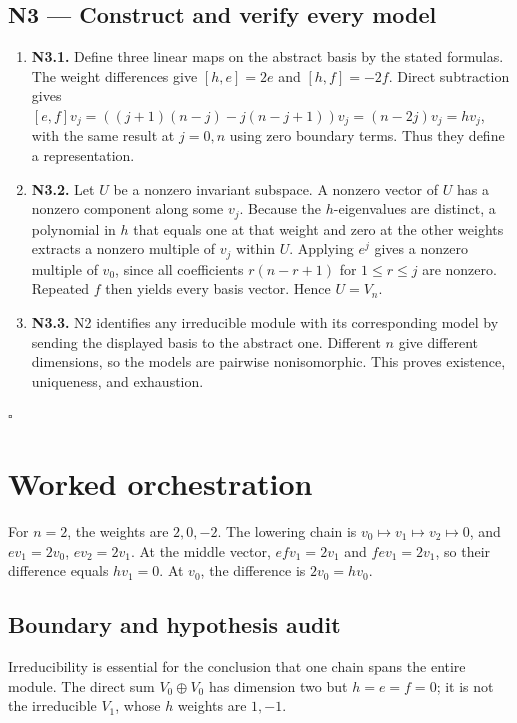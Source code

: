 \documentclass[preprint,12pt,aps,pra,showkeys,amsmath,amssymb,superscriptaddress,floatfix]{revtex4-2}
\theoremstyle{definition}
\theoremstyle{remark}
\begin{document}
\subsection{N3 --- Construct and verify every
model}\label{n3-construct-and-verify-every-model}

\begin{enumerate}
\def\labelenumi{\arabic{enumi}.}
\item
  \textbf{N3.1.} Define three linear maps on the abstract basis by the
  stated formulas. The weight differences give \([h,e]=2e\) and
  \([h,f]=-2f\). Direct subtraction gives
  \([e,f]v_j=((j+1)(n-j)-j(n-j+1))v_j=(n-2j)v_j=hv_j\), with the same
  result at \(j=0,n\) using zero boundary terms. Thus they define a
  representation.
\item
  \textbf{N3.2.} Let \(U\) be a nonzero invariant subspace. A nonzero
  vector of \(U\) has a nonzero component along some \(v_j\). Because
  the \(h\)-eigenvalues are distinct, a polynomial in \(h\) that equals
  one at that weight and zero at the other weights extracts a nonzero
  multiple of \(v_j\) within \(U\). Applying \(e^j\) gives a nonzero
  multiple of \(v_0\), since all coefficients \(r(n-r+1)\) for
  \(1\le r\le j\) are nonzero. Repeated \(f\) then yields every basis
  vector. Hence \(U=V_n\).
\item
  \textbf{N3.3.} N2 identifies any irreducible module with its
  corresponding model by sending the displayed basis to the abstract
  one. Different \(n\) give different dimensions, so the models are
  pairwise nonisomorphic. This proves existence, uniqueness, and
  exhaustion.
\end{enumerate}

\hfill$\square$

\section{Worked orchestration}

For \(n=2\), the weights are \(2,0,-2\). The lowering chain is
\(v_0\mapsto v_1\mapsto v_2\mapsto0\), and \(ev_1=2v_0\), \(ev_2=2v_1\).
At the middle vector, \(efv_1=2v_1\) and \(fev_1=2v_1\), so their
difference equals \(hv_1=0\). At \(v_0\), the difference is
\(2v_0=hv_0\).

\subsection{Boundary and hypothesis audit}

Irreducibility is essential for the conclusion that one chain spans the
entire module. The direct sum \(V_0\oplus V_0\) has dimension two but
\(h=e=f=0\); it is not the irreducible \(V_1\), whose \(h\) weights are
\(1,-1\).
\end{document}
